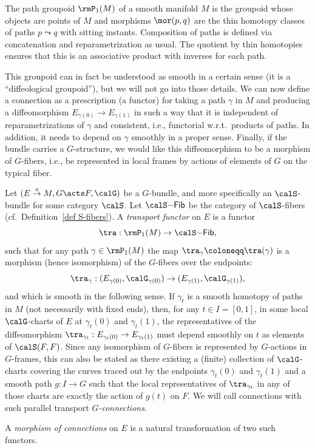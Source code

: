\begin{defn}
    The path groupoid $\rmP_1(M)$ of a smooth manifold $M$ is the groupoid whose objects are points of $M$ and morphisms $\mor(p,q)$ are the thin homotopy classes of paths $p\leadsto q$ with sitting instants. Composition of paths is defined via concatenation and reparametrization as usual. The quotient by thin homotopies ensures that this is an associative product with inverses for each path.
\end{defn}

This groupoid can in fact be understood as smooth in a certain sense (it is a ``diffeological groupoid''), but we will not go into those details. We can now define a connection as a prescription (a functor) for taking a path $\gamma$ in $M$ and producing a diffeomorphism $E_{\gamma(0)}\to E_{\gamma(1)}$ in such a way that it is independent of reparametrizations of $\gamma$ and consistent, i.e., functorial w.r.t.\ products of paths. In addition, it needs to depend on $\gamma$ smoothly in a proper sense. Finally, if the bundle carries a $G$-structure, we would like this diffeomorphism to be a morphism of $G$-fibers, i.e., be represented in local frames by actions of elements of $G$ on the typical fiber.

\begin{defn}
    Let $(E\overset{\pi}{\to}M,G\acts F,\calG)$ be a $G$-bundle, and more specifically an $\calS$-bundle for some category $\calS$. Let $\calS\mathsf{-Fib}$ be the category of $\calS$-fibers (cf.~Definition~\ref{def S-fibers}). A \emph{transport functor} on $E$ is a functor
    \[\tra: \rmP_1(M)\to \calS\mathsf{-Fib},\]
    such that for any path $\gamma\in\rmP_1(M)$ the map $\tra_\gamma\coloneqq \tra(\gamma)$ is a morphism (hence isomorphism) of the $G$-fibers over the endpoints:
    \[\tra_\gamma:(E_{\gamma(0)},\calG_{\gamma(0)})\to (E_{\gamma(1)},\calG_{\gamma(1)}),\]
    and which is smooth in the following sense. If $\gamma_t$ is a smooth homotopy of paths in $M$ (not necessarily with fixed ends), then, for any $t\in I=[0,1]$, in some local $\calG$-charts of $E$ at $\gamma_t(0)$ and $\gamma_t(1)$, the representatives of the diffeomorphism $\tra_{\gamma_t}:E_{\gamma_t(0)}\to E_{\gamma_t(1)}$ must depend smoothly on $t$ as elements of $\calS(F,F)$. Since any isomorphism of $G$-fibers is represented by $G$-actions in $G$-frames, this can also be stated as there existing a (finite) collection of $\calG$-charts covering the curves traced out by the endpoints $\gamma_t(0)$ and $\gamma_t(1)$ and a smooth path $g:I\to G$ such that the local representatives of $\tra_{\gamma_t}$ in any of those charts are exactly the action of $g(t)$ on $F$. We will call connections with such parallel transport \emph{$G$-connections}.

    A \emph{morphism of connections} on $E$ is a natural transformation of two such functors.
\end{defn}

